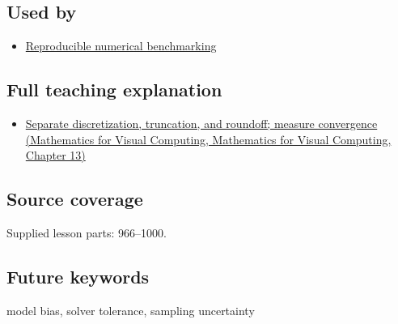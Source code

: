 \subsection{Used by}\label{appendix-31b8c295e05f-used-by}

\begin{itemize}
\tightlist
\item
  \hyperref[appendix-b9db93e28371]{Reproducible numerical benchmarking}
\end{itemize}

\subsection{Full teaching explanation}\label{appendix-31b8c295e05f-full-teaching-explanation}

\begin{itemize}
\tightlist
\item
  \href{../02-Mathematics-for-Visual-Computing/main.pdf\#nameddest=02-foundations-ii-ch029-separate-discretization-truncation-and-roundoff-measure-convergence}{Separate discretization, truncation, and roundoff; measure convergence (Mathematics for Visual Computing, Mathematics for Visual Computing, Chapter 13)}
\end{itemize}

\subsection{Source coverage}\label{appendix-31b8c295e05f-source-coverage}

Supplied lesson parts: 966--1000.

\subsection{Future keywords}\label{appendix-31b8c295e05f-future-keywords}

model bias, solver tolerance, sampling uncertainty
